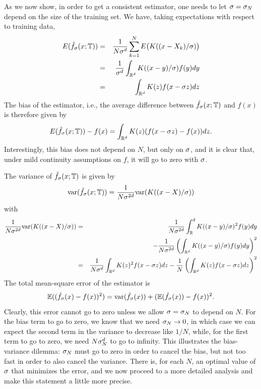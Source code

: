 As we now show, in order to get a consistent estimator, one needs to let  $\sigma = \sigma_N$ depend on the size of
the training set. 
We have, taking expectations with respect to training data, 
\begin{eqnarray*}
E({\hat{f}}_\sigma(x;{\mathbb T})) &=& \frac{1}{N\sigma^d} \sum_{k=1}^N E\big
(K((x-X_k)/\sigma)\big)\\
&=& \frac{1}{\sigma^d} \int_{{\mathbb{R}}^d} K((x-y)/\sigma) f(y) dy\\
&=& \int_{{\mathbb{R}}^d} K(z) f(x-\sigma z) dz
\end{eqnarray*}
The bias of the estimator, i.e., the average difference between ${\hat{f}}_\sigma(x;{\mathbb T})$ and
$f(x)$ is therefore given by
$$
E({\hat{f}}_\sigma(x;{\mathbb T})) - f(x) = \int_{{\mathbb{R}}^d} K(z) (f(x-\sigma z) - f(x)) dz.
$$
Interestingly, this bias does not depend on $N$, but only on $\sigma$, and it is clear that, under mild continuity assumptions on $f$, it will go to zero with $\sigma$. 

The variance of ${\hat{f}}_\sigma(x;{\mathbb T})$ is given by
$$
\mathrm{var}({\hat{f}}_\sigma(x;{\mathbb T})) = \frac{1}{N\sigma^{2d}} \mathrm{var}(K((x-X)/\sigma))
$$
with
\begin{eqnarray*}
\frac{1}{N\sigma^{2d}} \mathrm{var}(K((x-X)/\sigma)) &=& \frac{1}{N\sigma^{2d}} \int_{\mathbb{R}}^d
K((x-y)/\sigma)^2 f(y) dy \\
&& - \frac{1}{N\sigma^{2d}} \left(\int_{{\mathbb{R}}^d}
K((x-y)/\sigma) f(y) dy\right)^2\\
&=& \frac{1}{N\sigma^d} \int_{{\mathbb{R}}^d} K(z)^2 f(x-\sigma z) dz - \frac1N
\left(\int_{{\mathbb{R}}^d}
K(z) f(x-\sigma z) dz\right)^2
\end{eqnarray*}
The total mean-square error of the estimator is
$$
\bm{\mathbb E}(({\hat{f}}_\sigma(x) - f(x))^2) =  \mathrm{var}({\hat{f}}_\sigma(x)) + (\bm{\mathbb E}({\hat{f}}_\sigma(x)) -
f(x))^2.
$$
Clearly, this error cannot go to zero unless we allow $\sigma = \sigma_N$ to depend on $N$. For the bias term to go to zero, we know that we need $\sigma_N \to 0$, in which case we can expect the second term in the variance to decrease like $1/N$, while, for the first term to go to zero, we need $N\sigma_N^d$ to go to infinity. This illustrates the bias-variance dilemma: $\sigma_N$ must go to zero in order to cancel the bias, but not too fast in order to also cancel the variance. There is, for each $N$, an optimal value of $\sigma$ that minimizes the error, and we now proceed to a more detailed analysis and make this statement a little more precise.

